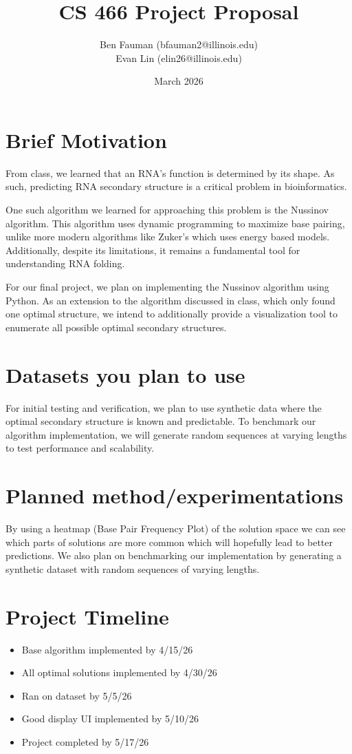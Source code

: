 \documentclass[12pt]{article}
\title{CS 466 Project Proposal}
\author{Ben Fauman (bfauman2@illinois.edu)\\ Evan Lin (elin26@illinois.edu)}
\date{March 2026}
\begin{document}
\maketitle
\section*{Brief Motivation}
From class, we learned that an RNA's function is determined by its shape. As such, predicting RNA secondary structure is a critical problem in bioinformatics.

One such algorithm we learned for approaching this problem is the Nussinov algorithm. This algorithm uses dynamic programming to maximize base pairing, unlike more modern algorithms like Zuker's which uses energy based models. Additionally, despite its limitations, it remains a fundamental tool for understanding RNA folding.

For our final project, we plan on implementing the Nussinov algorithm using Python. As an extension to the algorithm discussed in class, which only found one optimal structure, we intend to additionally provide a visualization tool to enumerate all possible optimal secondary structures. 
\section*{Datasets you plan to use}
For initial testing and verification, we plan to use synthetic data where the optimal secondary structure is known and predictable. To benchmark our algorithm implementation, we will generate random sequences at varying lengths to test performance and scalability.
\section*{Planned method/experimentations}
By using a heatmap (Base Pair Frequency Plot) of the solution space we can see which parts of solutions are more common which will hopefully lead to better predictions. We also plan on benchmarking our implementation by generating a synthetic dataset with random sequences of varying lengths.

\section*{Project Timeline}
\begin{itemize}
\item Base algorithm implemented by 4/15/26
\item All optimal solutions implemented by 4/30/26
\item Ran on dataset by 5/5/26
\item Good display UI implemented by 5/10/26
\item Project completed by 5/17/26
\end{itemize}
\end{document}
